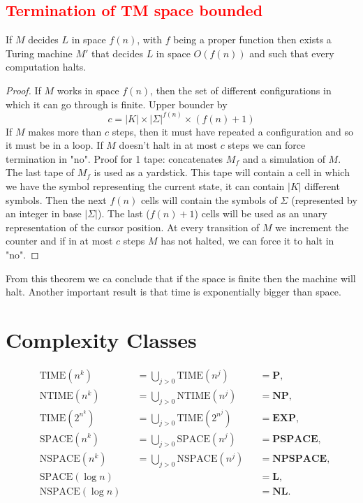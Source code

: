 \documentclass[12pt]{article}
\begin{document}
\subsection{\textcolor{red}{Termination of TM space bounded}}
\begin{defbox}[\textcolor{red}{Theorem (Termination of TM space bounded)}]
If $M$ decides $L$ in space $f(n)$, with $f$ being a proper function then exists a Turing machine $M'$ that decides $L$ in space $O(f(n))$ and such that every computation halts.
\end{defbox}
\begin{proof}
  If $M$ works in space $f(n)$, then the set of different configurations in which it can go through is finite. 
  Upper bounder by 
  $$c=|K|\times|\Sigma|^{f(n)}\times (f(n)+1)$$
  If $M$ makes more than $c$ steps, then it must have repeated a configuration and so it must be in a loop. If $M$ doesn't halt in at most $c$ steps we can force termination in "no".
  Proof for 1 tape: concatenates $M_f$ and a simulation of $M$. The last tape of $M_f$ is used as a yardstick. This tape will contain a cell in which we have the symbol representing the current state, it can contain $|K|$ different symbols. Then the next $f(n)$ cells will contain the symbols of $\Sigma$ (represented by an integer in base $|\Sigma|$). The last ($f(n)+1$) cells will be used as an unary representation of the cursor position.
  At every transition of $M$ we increment the counter and if in at most $c$ steps $M$ has not halted, we can force it to halt in "no".
\end{proof}

From this theorem we ca conclude that if the space is finite then the machine will halt. Another important result is that time is exponentially bigger than space. 

\section{Complexity Classes}
\[
\begin{aligned}
    &\text{TIME}(n^k) && = \bigcup_{j > 0} \text{TIME}(n^j)  &&= \textbf{P}, \\
    &\text{NTIME}(n^k) && = \bigcup_{j > 0} \text{NTIME}(n^j)  &&= \textbf{NP}, \\
    &\text{TIME}(2^{n^k}) && = \bigcup_{j > 0} \text{TIME}(2^{n^j})  &&= \textbf{EXP}, \\
    &\text{SPACE}(n^k) && = \bigcup_{j > 0} \text{SPACE}(n^j)  &&= \textbf{PSPACE}, \\
    &\text{NSPACE}(n^k) && = \bigcup_{j > 0} \text{NSPACE}(n^j) && = \textbf{NPSPACE}, \\
    &\text{SPACE}(\log n) &&&& = \textbf{L}, \\
    &\text{NSPACE}(\log n) &&&& = \textbf{NL}.
\end{aligned}
\]
\end{document}
